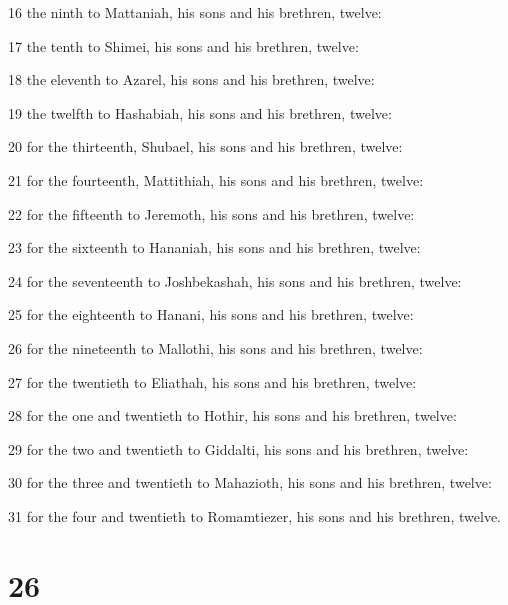 \par 16 the ninth to Mattaniah, his sons and his brethren, twelve:
\par 17 the tenth to Shimei, his sons and his brethren, twelve:
\par 18 the eleventh to Azarel, his sons and his brethren, twelve:
\par 19 the twelfth to Hashabiah, his sons and his brethren, twelve:
\par 20 for the thirteenth, Shubael, his sons and his brethren, twelve:
\par 21 for the fourteenth, Mattithiah, his sons and his brethren, twelve:
\par 22 for the fifteenth to Jeremoth, his sons and his brethren, twelve:
\par 23 for the sixteenth to Hananiah, his sons and his brethren, twelve:
\par 24 for the seventeenth to Joshbekashah, his sons and his brethren, twelve:
\par 25 for the eighteenth to Hanani, his sons and his brethren, twelve:
\par 26 for the nineteenth to Mallothi, his sons and his brethren, twelve:
\par 27 for the twentieth to Eliathah, his sons and his brethren, twelve:
\par 28 for the one and twentieth to Hothir, his sons and his brethren, twelve:
\par 29 for the two and twentieth to Giddalti, his sons and his brethren, twelve:
\par 30 for the three and twentieth to Mahazioth, his sons and his brethren, twelve:
\par 31 for the four and twentieth to Romamtiezer, his sons and his brethren, twelve.

\chapter{26}

